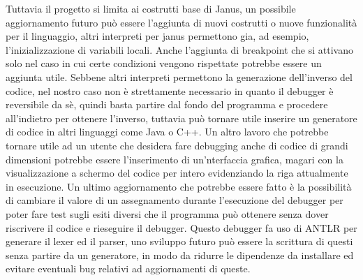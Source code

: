 \documentclass{article}
\theoremstyle{plain}
\theoremstyle{definition}
\theoremstyle{plain}
\begin{document}
Tuttavia il progetto si limita ai costrutti base di Janus, un possibile aggiornamento futuro può essere l'aggiunta di nuovi costrutti o nuove funzionalità per il linguaggio, altri interpreti per janus permettono gia, ad esempio, l'inizializzazione di variabili locali. Anche l'aggiunta di breakpoint che si attivano solo nel caso in cui certe condizioni vengono rispettate potrebbe essere un aggiunta utile. Sebbene altri interpreti permettono la generazione dell'inverso del codice, nel nostro caso non è strettamente necessario in quanto il debugger è reversibile da sè, quindi basta partire dal fondo del programma e procedere all'indietro per ottenere l'inverso, tuttavia può tornare utile inserire un generatore di codice in altri linguaggi come Java o C++. Un altro lavoro che potrebbe tornare utile ad un utente che desidera fare debugging anche di codice di grandi dimensioni potrebbe essere l'inserimento di un'nterfaccia grafica, magari con la visualizzazione a schermo del codice per intero evidenziando la riga attualmente in esecuzione. Un ultimo aggiornamento che potrebbe essere fatto è la possibilità di cambiare il valore di un assegnamento durante l'esecuzione del debugger per poter fare test sugli esiti diversi che il programma può ottenere senza dover riscrivere il codice e rieseguire il debugger. Questo debugger fa uso di ANTLR per generare il lexer ed il parser, uno sviluppo futuro può essere la scrittura di questi senza partire da un generatore, in modo da ridurre le dipendenze da installare ed evitare eventuali bug relativi ad aggiornamenti di queste.



\end{document}
